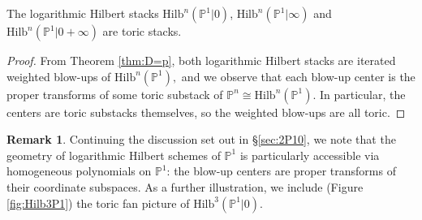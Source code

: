 \documentclass[10.5pt]{amsart}
\theoremstyle{definition}
\theoremstyle{definition}
\newenvironment{customcor}[1]
  {\renewcommand\theinnercustomcor{#1}\innercustomcor}
  {\endinnercustomcor}
\theoremstyle{definition}
\theoremstyle{definition}
\newtheorem{remark}[theorem]{Remark}
\newcommand{\PP}{\mathbb{P}}
\newcommand{\Hilb}{\mathrm{Hilb}}
\begin{document}
\begin{customcor}{C}\label{cor:P1}
    The logarithmic Hilbert stacks $\Hilb^n(\PP^1|0)$, $\Hilb^n(\PP^1|\infty)$ and $\Hilb^n(\PP^1|0+\infty)$ are toric stacks.
\end{customcor}


\begin{proof}
    From Theorem \ref{thm:D=p}, both logarithmic Hilbert stacks are iterated weighted blow-ups of $\Hilb^n(\PP^1),$ and we observe that each blow-up center is the proper transforms of some toric substack of $\PP^n\cong\Hilb^n(\PP^1).$ In particular, the centers are toric substacks themselves, so the weighted blow-ups are all toric.
\end{proof}


\begin{remark}
Continuing the discussion set out in §\ref{sec:2P10}, we note that the geometry of logarithmic Hilbert schemes of $\PP^1$ is particularly accessible via homogeneous polynomials on $\PP^1$: the blow-up centers are proper transforms of their coordinate subspaces. As a further illustration, we include (Figure \ref{fig:Hilb3P1}) the toric fan picture of $\Hilb^3(\PP^1|0).$
\end{remark}
\end{document}
